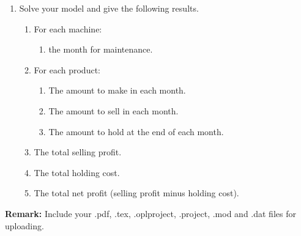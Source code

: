 \documentclass[12pt,a4paper]{article}
\theoremstyle{definition}
\begin{document}
\begin{enumerate}
\begin{enumerate}
		\item
		Solve your model and give the following results.
		\begin{enumerate}
			\item
			For each machine:
			\begin{enumerate}
				\item
				the month for maintenance.
			\end{enumerate}
			\item
			For each product:
			\begin{enumerate}
				\item
				The amount to make in each month.
				\item
				The amount to sell in each month.
				\item
				The amount to hold at the end of each month.
			\end{enumerate}
			\item
			The total selling profit.
			\item
			The total holding cost.
			\item
			The total net profit (selling profit minus holding cost).
		\end{enumerate}
	\end{enumerate}
	
\end{enumerate}



\textbf{Remark:} Include your .pdf, .tex, .oplproject, .project, .mod and .dat files for uploading.


\end{document}
